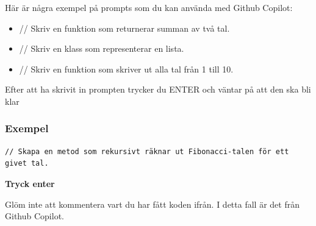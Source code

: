 Här är några exempel på prompts som du kan använda med Github Copilot:

\begin{itemize}
\tightlist
\item
  // Skriv en funktion som returnerar summan av två tal.
\item
  // Skriv en klass som representerar en lista.
\item
  // Skriv en funktion som skriver ut alla tal från 1 till 10.
\end{itemize}

Efter att ha skrivit in prompten trycker du ENTER och väntar på att den
ska bli klar

\hypertarget{exempel}{%
\subsubsection{Exempel}\label{exempel}}

\begin{verbatim}
// Skapa en metod som rekursivt räknar ut Fibonacci-talen för ett givet tal.
\end{verbatim}

\textbf{Tryck enter}

\hypertarget{cb2}{}
\begin{Shaded}
\begin{Highlighting}[]
   \OperatorTok{(}\OperatorTok{)} \OperatorTok{\{}
     \OperatorTok{(}\OperatorTok{\textless{}=} \OperatorTok{)} \OperatorTok{\{}
        \OperatorTok{;}
    \OperatorTok{\}}
     \OperatorTok{(}\OperatorTok{{-}} \OperatorTok{)} \OperatorTok{+} \OperatorTok{(}\OperatorTok{{-}} \OperatorTok{);}
\OperatorTok{\}}
\end{Highlighting}
\end{Shaded}

Glöm inte att kommentera vart du har fått koden ifrån. I detta fall är
det från Github Copilot.

\hypertarget{cb3}{}
\begin{Shaded}
\begin{Highlighting}[]
\end{Highlighting}
\end{Shaded}

